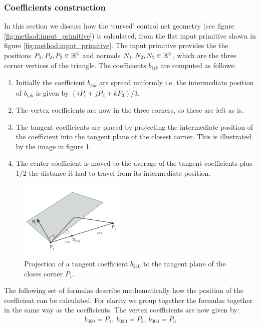 \subsubsection{Coefficients construction} \label{sss:control_point_construction}
In this section we discuss how the `curved' control net geometry (see figure \ref{fig:method:input_primitive}) is calculated, from the flat input primitive shown in figure \ref{fig:method:input_primitive}. The input primitive provides the the positions $P_1, P_2, P_3 \in \mathbb{R}^3$ and normals $N_1, N_2, N_3 \in \mathbb{R}^3$, which are the three corner vertices of the triangle. The coefficients $b_{ijk}$ are computed as follows:
%
\begin{enumerate}
	\item Initially the coefficient $b_{ijk}$ are spread uniformly i.e. the intermediate position of $b_{ijk}$ is given by $(i P_i + j P_2 + kP_3) / 3$.
	\item The vertex coefficients are now in the three corners, so these are left as is.
	\item The tangent coefficients are placed by projecting the intermediate position of the coefficient into the tangent plane of the closest corner. This is illustrated by the image in figure \ref{fig:method:geometry_tangent_projection.png}.
	\item The center coefficient is moved to the average of the tangent coefficients plus $1/2$ the distance it had to travel from its intermediate position.
\end{enumerate}
%
\begin{figure}
	\centering
	\includegraphics[width=0.45\textwidth]{./content/img/method/geometry_tangent_projection.png}
	\caption{Projection of a tangent coefficient $b_{210}$ to the tangent plane of the closes corner $P_1$.}
	\label{fig:method:geometry_tangent_projection.png}
\end{figure}
%
The following set of formulas describe mathematically how the position of the coefficient can be calculated. For clarity we group together the formulas together in the same way as the coefficients. The vertex coefficients are now given by:
\begin{align}
	b_{300} = P_1,\ b_{030} = P_2,\ b_{003} = P_3
\end{align}
%
%


